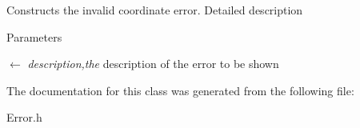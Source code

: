 Constructs the invalid coordinate error. Detailed description 
\begin{DoxyParams}{Parameters}
\item[\mbox{$\leftarrow$} {\em description,the}]description of the error to be shown \end{DoxyParams}


The documentation for this class was generated from the following file:\begin{DoxyCompactItemize}
\item 
Error.h\end{DoxyCompactItemize}
